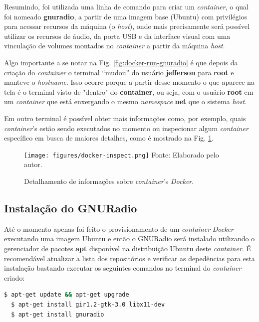 \documentclass[
  12pt,				%
  openright,			%
  twoside,			%
  a4paper,			%
  english,			%
  french,				%
  spanish,			%
  brazil,				%
  ]{abntex2}
\begin{document}
Resumindo, foi utilizada uma linha de comando para criar um \textit{container}, o qual foi nomeado \textbf{gnuradio}, a partir de uma imagem base (Ubuntu) com
privilégios para acessar recursos da máquina (o \textit{host}), onde mais precisamente será possível utilizar os recursos de áudio, da porta USB e da
interface visual com uma vinculação de volumes montados no \textit{container} a partir da máquina \textit{host}.

Algo importante a se notar na Fig. \ref{fig:docker-run-gnuradio} é que depois da criação do \textit{container} o terminal “mudou” do usuário \textbf{jefferson} para \textbf{root}
e manteve o \textit{hostname}. Isso ocorre porque a partir desse momento o que aparece na tela é o terminal visto de "dentro"
do \textbf{container}, ou seja, com o usuário \textbf{root} em um \textit{container} que está enxergando o mesmo \textit{namespace} \textbf{net} que o
sistema \textit{host}.

Em outro terminal é possível obter mais informações como, por exemplo, quais \textit{container}'s estão sendo executados no momento ou inspecionar algum
\textit{container} específico em busca de maiores detalhes, como é mostrado na Fig. \ref{fig:docker-inspect}.

\begin{figure}[!htb]
  \centering
  \caption{Detalhamento de informações sobre \textit{container}’s \textit{Docker}.}
  \texttt{[image: figures/docker-inspect.png]}
  Fonte: Elaborado pelo autor.
  \label{fig:docker-inspect}
\end{figure}

\newpage
\subsection*{Instalação do GNURadio}

Até o momento apenas foi feito o provisionamento de um \textit{container} \textit{Docker} executando uma imagem Ubuntu e então o GNURadio será instalado utilizando
o gerenciador de pacotes \textbf{apt} disponível na distribuição Ubuntu deste \textit{container}. É recomendável atualizar a lista dos repositórios e verificar
as depedências para esta instalação bastando executar os seguintes comandos no terminal do \textit{container} criado:

\begin{adjustbox}{max width=\linewidth}
  \begin{lstlisting}[language=bash]
  $ apt-get update && apt-get upgrade
  $ apt-get install gir1.2-gtk-3.0 libx11-dev
  $ apt-get install gnuradio
\end{lstlisting}
\end{adjustbox}
\end{document}
